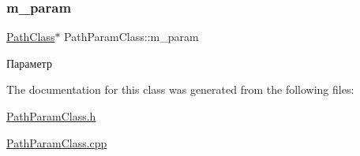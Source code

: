 \subsubsection{\texorpdfstring{m\+\_\+param}{m\_param}}
{\footnotesize\ttfamily \hyperlink{class_path_class}{Path\+Class}$\ast$ Path\+Param\+Class\+::m\+\_\+param\hspace{0.3cm}{\ttfamily [private]}}



Параметр 



The documentation for this class was generated from the following files\+:\begin{DoxyCompactItemize}
\item 
\hyperlink{_path_param_class_8h}{Path\+Param\+Class.\+h}\item 
\hyperlink{_path_param_class_8cpp}{Path\+Param\+Class.\+cpp}\end{DoxyCompactItemize}
